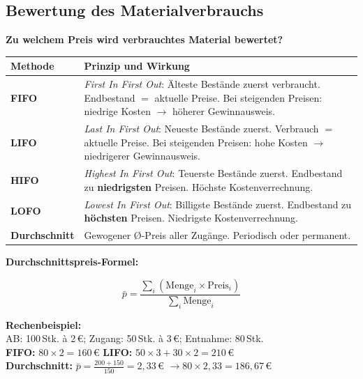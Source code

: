 \documentclass[10pt,a4paper]{article}
\begin{document}
\begin{multicols}{2}
\subsection{Bewertung des Materialverbrauchs}

\textbf{Zu welchem Preis wird verbrauchtes Material bewertet?}

\begin{tabular}{|L{2.2cm}|L{4.8cm}|}
\hline
{}
\textbf{Methode} & \textbf{Prinzip und Wirkung} \\
\hline
\textbf{FIFO} & \textit{First In First Out}: Älteste Bestände zuerst verbraucht. Endbestand $=$ aktuelle Preise. Bei steigenden Preisen: niedrige Kosten $\to$ höherer Gewinnausweis. \\
\hline
\textbf{LIFO} & \textit{Last In First Out}: Neueste Bestände zuerst. Verbrauch $=$ aktuelle Preise. Bei steigenden Preisen: hohe Kosten $\to$ niedrigerer Gewinnausweis. \\
\hline
\textbf{HIFO} & \textit{Highest In First Out}: Teuerste Bestände zuerst. Endbestand zu \textbf{niedrigsten} Preisen. Höchste Kostenverrechnung. \\
\hline
\textbf{LOFO} & \textit{Lowest In First Out}: Billigste Bestände zuerst. Endbestand zu \textbf{höchsten} Preisen. Niedrigste Kostenverrechnung. \\
\hline
\textbf{Durchschnitt} & Gewogener Ø-Preis aller Zugänge. Periodisch oder permanent. \\
\hline
\end{tabular}

\vspace{4pt}
\textbf{Durchschnittspreis-Formel:}
\begin{formelbox}
\[
\bar{p} = \frac{\sum_{i}(\text{Menge}_i \times \text{Preis}_i)}{\sum_{i} \text{Menge}_i}
\]
\end{formelbox}

\begin{hinweisbox}
\textbf{Rechenbeispiel:}\\
AB: 100\,Stk. à 2\,€; Zugang: 50\,Stk. à 3\,€; Entnahme: 80\,Stk.\\
\textbf{FIFO:} $80 \times 2 = 160$\,€ \quad \textbf{LIFO:} $50\times 3 + 30\times 2 = 210$\,€\\
\textbf{Durchschnitt:} $\bar{p} = \frac{200+150}{150} = 2{,}33$\,€ $\to 80\times 2{,}33 = 186{,}67$\,€
\end{hinweisbox}

\end{multicols}
\end{document}
